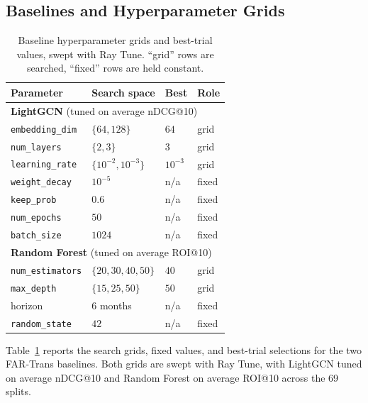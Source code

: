 \subsection{Baselines and Hyperparameter Grids}
\label{sec:exp:grids}

\begin{table}[H]
\centering
\small
\begin{tabular}{llll}
\toprule
Parameter & Search space & Best & Role \\
\midrule
\multicolumn{4}{l}{\textbf{LightGCN} (tuned on average nDCG@10)} \\
\texttt{embedding\_dim}    & $\{64, 128\}$          & $64$      & grid \\
\texttt{num\_layers}       & $\{2, 3\}$             & $3$       & grid \\
\texttt{learning\_rate}    & $\{10^{-2}, 10^{-3}\}$ & $10^{-3}$ & grid \\
\texttt{weight\_decay}     & $10^{-5}$              & n/a       & fixed \\
\texttt{keep\_prob}        & $0.6$                  & n/a       & fixed \\
\texttt{num\_epochs}       & $50$                   & n/a       & fixed \\
\texttt{batch\_size}       & $1024$                 & n/a       & fixed \\
\midrule
\multicolumn{4}{l}{\textbf{Random Forest} (tuned on average ROI@10)} \\
\texttt{num\_estimators}   & $\{20, 30, 40, 50\}$   & $40$      & grid \\
\texttt{max\_depth}        & $\{15, 25, 50\}$        & $50$      & grid \\
horizon                    & 6 months               & n/a       & fixed \\
\texttt{random\_state}     & $42$                   & n/a       & fixed \\
\bottomrule
\end{tabular}
\caption{Baseline hyperparameter grids and best-trial values, swept with Ray Tune. ``grid'' rows are searched, ``fixed'' rows are held constant.}
\label{tab:baseline-grids}
\end{table}

Table~\ref{tab:baseline-grids} reports the search grids, fixed values, and best-trial selections for the two FAR-Trans baselines. Both grids are swept with Ray Tune, with LightGCN tuned on average nDCG@10 and Random Forest on average ROI@10 across the 69 splits.

